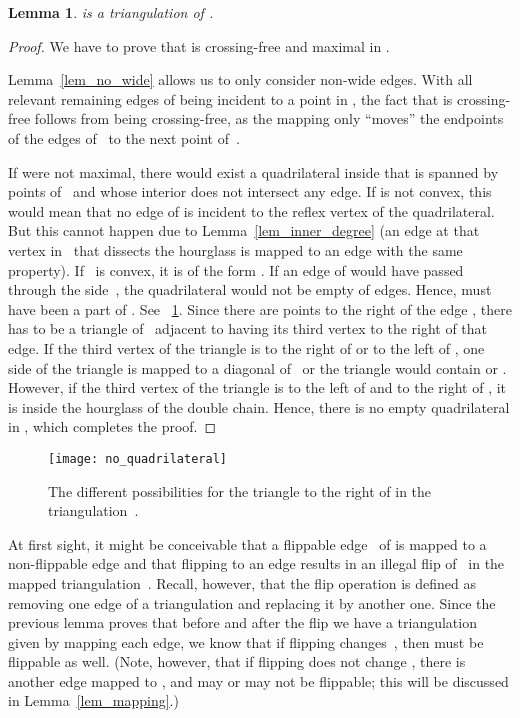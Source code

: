 \documentclass[11pt,a4paper]{article}
\newcommand{\myqed}{\qed}
\renewcommand{\myqed}{}
\newtheorem{lemma}[theorem]{Lemma}
\begin{document}
\begin{lemma}\label{lem_local_triangulation}
 is a triangulation of .
\end{lemma}
\begin{proof}
We have to prove that  is crossing-free and maximal in .

Lemma~\ref{lem_no_wide} allows us to only consider non-wide edges.
With all relevant remaining edges of  being incident to a point in , the fact that  is crossing-free follows from  being crossing-free, as the mapping only ``moves'' the endpoints of the edges of~ to the next point of~.

If  were not maximal, there would exist a quadrilateral  inside  that is spanned by points of~ and whose interior does not intersect any edge.
If  is not convex, this would mean that no edge of  is incident to the reflex vertex of the quadrilateral.
But this cannot happen due to Lemma~\ref{lem_inner_degree} (an edge at that vertex in~ that dissects the hourglass is mapped to an edge with the same property).
If~ is convex, it is of the form .
If an edge of  would have passed through the side~, the quadrilateral would not be empty of edges.
Hence,  must have been a part of .
See \figurename~\ref{fig_no_quadrilateral}.
Since there are points to the right of the edge , there has to be a triangle of~ adjacent to  having its third vertex to the right of that edge.
If the third vertex of the triangle is to the right of  or to the left of , one side of the triangle is mapped to a diagonal of~ or the triangle would contain  or .
However, if the third vertex of the triangle is to the left of  and to the right of , it is inside the hourglass of the double chain.
Hence, there is no empty quadrilateral in , which completes the proof.
\myqed
\end{proof}

\begin{figure}
\centering
\texttt{[image: no\_quadrilateral]}
\caption{The different possibilities for the triangle to the right of  in the triangulation~.}
\label{fig_no_quadrilateral}
\end{figure}


At first sight, it might be conceivable that a flippable edge~ of  is mapped to a non-flippable edge  and that flipping  to an edge  results in an illegal flip of~ in the mapped triangulation~.
Recall, however, that the flip operation is defined as removing one edge of a triangulation and replacing it by another one.
Since the previous lemma proves that before and after the flip we have a triangulation given by mapping each edge, we know that if flipping  changes~, then  must be flippable as well.
(Note, however, that if flipping  does not change , there is another edge mapped to , and  may or may not be flippable; this will be discussed in Lemma~\ref{lem_mapping}.)
\end{document}
